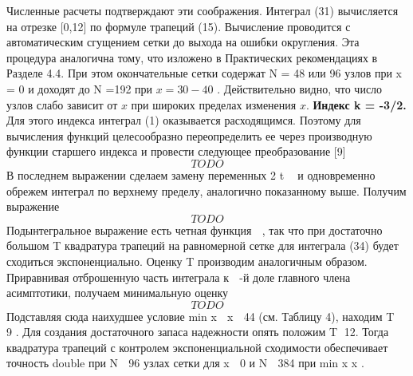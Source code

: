 Численные расчеты подтверждают эти соображения. Интеграл (31)
вычисляется на отрезке [0,12] по формуле трапеций (15). Вычисление
проводится с автоматическим сгущением сетки до выхода на ошибки
округления. Эта процедура аналогична тому, что изложено в Практических
рекомендациях в Разделе 4.4. При этом окончательные сетки содержат N = 48
или 96 узлов при x = 0 и доходят до N =192 при $x=30-40$ . Действительно
видно, что число узлов слабо зависит от $x$ при широких пределах изменения $x$.
\textbf{Индекс k = -3/2.} Для этого индекса интеграл (1) оказывается
расходящимся. Поэтому для вычисления функций целесообразно
переопределить ее через производную функции старшего индекса и провести
следующее преобразование [9]
\begin{equation}
TODO
\end{equation}
В последнем выражении сделаем замену переменных 2 t  и одновременно
обрежем интеграл по верхнему пределу, аналогично показанному выше.
Получим выражение
\begin{equation}
TODO
\end{equation}
Подынтегральное выражение есть четная функция  , так что при достаточно
большом T квадратура трапеций на равномерной сетке для интеграла (34)
будет сходиться экспоненциально. Оценку T производим аналогичным
образом. Приравнивая отброшенную часть интеграла к  -й доле главного члена
асимптотики, получаем минимальную оценку
\begin{equation}
TODO
\end{equation}
Подставляя сюда наихудшее условие min x  x  44 (см. Таблицу 4), находим
T  9 . Для создания достаточного запаса надежности опять положим T 12.
Тогда квадратура трапеций с контролем экспоненциальной сходимости
обеспечивает точность double при N  96 узлах сетки для x  0 и N  384 при
min x  x .
